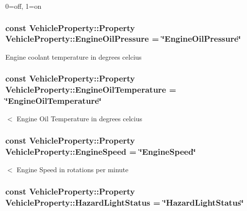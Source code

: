 0=off, 1=on \hypertarget{classVehicleProperty_ab7fad273c7149dbd338f53f2536aca26}{
\subsubsection[{Engine\-Oil\-Pressure}]{\setlength{\rightskip}{0pt plus 5cm}const Vehicle\-Property\-::\-Property Vehicle\-Property\-::\-Engine\-Oil\-Pressure = \char`\"{}Engine\-Oil\-Pressure\char`\"{}\hspace{0.3cm}{\ttfamily [static]}}}\label{classVehicleProperty_ab7fad273c7149dbd338f53f2536aca26}
Engine coolant temperature in degrees celcius \hypertarget{classVehicleProperty_a9d4a610d94b12f139ea00b271804a73f}{
\subsubsection[{Engine\-Oil\-Temperature}]{\setlength{\rightskip}{0pt plus 5cm}const Vehicle\-Property\-::\-Property Vehicle\-Property\-::\-Engine\-Oil\-Temperature = \char`\"{}Engine\-Oil\-Temperature\char`\"{}\hspace{0.3cm}{\ttfamily [static]}}}\label{classVehicleProperty_a9d4a610d94b12f139ea00b271804a73f}
$<$ Engine Oil Temperature in degrees celcius \hypertarget{classVehicleProperty_a7949fe3d031814fc2644de14f8cec9a0}{
\subsubsection[{Engine\-Speed}]{\setlength{\rightskip}{0pt plus 5cm}const Vehicle\-Property\-::\-Property Vehicle\-Property\-::\-Engine\-Speed = \char`\"{}Engine\-Speed\char`\"{}\hspace{0.3cm}{\ttfamily [static]}}}\label{classVehicleProperty_a7949fe3d031814fc2644de14f8cec9a0}
$<$ Engine Speed in rotations per minute \hypertarget{classVehicleProperty_a21058071101327c72251e2e09e24cb67}{
\subsubsection[{Hazard\-Light\-Status}]{\setlength{\rightskip}{0pt plus 5cm}const Vehicle\-Property\-::\-Property Vehicle\-Property\-::\-Hazard\-Light\-Status = \char`\"{}Hazard\-Light\-Status\char`\"{}\hspace{0.3cm}{\ttfamily [static]}}}\label{classVehicleProperty_a21058071101327c72251e2e09e24cb67}
